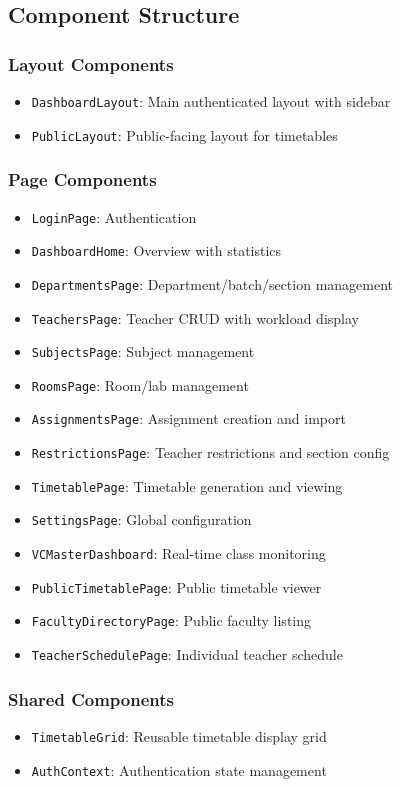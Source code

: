 \documentclass[12pt,a4paper]{article}
\begin{document}
\subsection{Component Structure}

\subsubsection{Layout Components}
\begin{itemize}
    \item \texttt{DashboardLayout}: Main authenticated layout with sidebar
    \item \texttt{PublicLayout}: Public-facing layout for timetables
\end{itemize}

\subsubsection{Page Components}
\begin{itemize}
    \item \texttt{LoginPage}: Authentication
    \item \texttt{DashboardHome}: Overview with statistics
    \item \texttt{DepartmentsPage}: Department/batch/section management
    \item \texttt{TeachersPage}: Teacher CRUD with workload display
    \item \texttt{SubjectsPage}: Subject management
    \item \texttt{RoomsPage}: Room/lab management
    \item \texttt{AssignmentsPage}: Assignment creation and import
    \item \texttt{RestrictionsPage}: Teacher restrictions and section config
    \item \texttt{TimetablePage}: Timetable generation and viewing
    \item \texttt{SettingsPage}: Global configuration
    \item \texttt{VCMasterDashboard}: Real-time class monitoring
    \item \texttt{PublicTimetablePage}: Public timetable viewer
    \item \texttt{FacultyDirectoryPage}: Public faculty listing
    \item \texttt{TeacherSchedulePage}: Individual teacher schedule
\end{itemize}

\subsubsection{Shared Components}
\begin{itemize}
    \item \texttt{TimetableGrid}: Reusable timetable display grid
    \item \texttt{AuthContext}: Authentication state management
\end{itemize}
\end{document}
